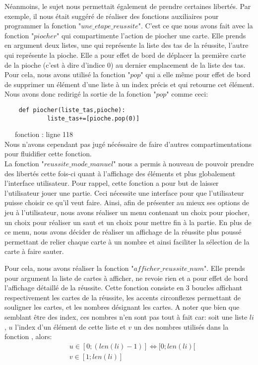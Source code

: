 \documentclass[10pt,a4paper,french,titlepage]{article}
\theoremstyle{definition}
\begin{document}
Néanmoins, le sujet nous permettait également de prendre certaines libertés. Par exemple, il nous était suggéré de réaliser des fonctions
auxiliaires pour programmer la fonction "$une\_etape\_reussite$". C'est ce que nous avons fait avec la fonction "$piocher$" qui compartimente l'action de 
piocher une carte. Elle prends en argument deux listes, une qui représente la liste des tas de la réussite, l'autre qui représente la pioche. Elle a 
pour effet de bord de déplacer la première carte de la pioche (c'est à dire d'indice 0) au dernier emplacement de la liste des tas. Pour cela, nous 
avons utilisé la fonction "$pop$" qui a elle même pour effet de bord de supprimer un élément d'une liste à un index précis et qui retourne cet élément.
Nous avons donc redirigé la sortie de la fonction "$pop$" comme ceci:\\
\begin{lstlisting}
	def piocher(liste_tas,pioche):
    		liste_tas+=[pioche.pop(0)]

\end{lstlisting}

~~~fonction : ligne 118\\



Nous n'avons cependant pas jugé nécéssaire de faire d'autres compartimentations pour fluidifier cette fonction.\\

La fonction "$reussite\_mode\_manuel$" nous a permis à nouveau de pouvoir prendre des libertés cette fois-ci quant à l'affichage des éléments et
plus globalement l'interface utilisateur. Pour rappel, cette fonction a pour but de laisser l'utilisateur jouer une partie. Ceci nécessite une interface
pour que l'utilisateur puisse choisir ce qu'il veut faire. Ainsi, afin de présenter au mieux ses options de jeu à l'utilisateur, nous avons réaliser un
menu contenant un choix pour piocher, un choix pour réaliser un saut et un choix pour mettre fin à la partie. En plus de ce menu, nous avons décider de
réaliser un affichage de la réussite plus poussé permettant de relier chaque carte à un nombre et ainsi faciliter la sélection de la carte à faire
sauter. 

Pour cela, nous avons réaliser la fonction "$afficher\_reussite\_num$". Elle prends pour argument la liste de cartes à afficher, ne revoie rien et a pour effet de bord l'affichage détaillé de la réussite. Cette fonction consiste en 3 boucles affichant respectivement les cartes de la réussite, les
accents circonflexes permettant de souligner les cartes, et les nombres désignant les cartes. A noter que bien que semblant être des index, ces nombres
n'en sont pas tout à fait car: soit une liste $li$, $u$ l'index d'un élément de cette liste et $v$ un des nombres utilisés dans la fonction , alors:
\begin{align*}
	&u \in [0;(len(li)-1)] \iff [0;len(li)[\\
	&v \in [1;len(li)]
\end{align*}
\end{document}
